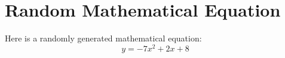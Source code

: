 \documentclass{article}
\begin{document}
\section*{Random Mathematical Equation}
Here is a randomly generated mathematical equation:
\[ y = -7x^2 + 2x + 8 \]
\end{document}
